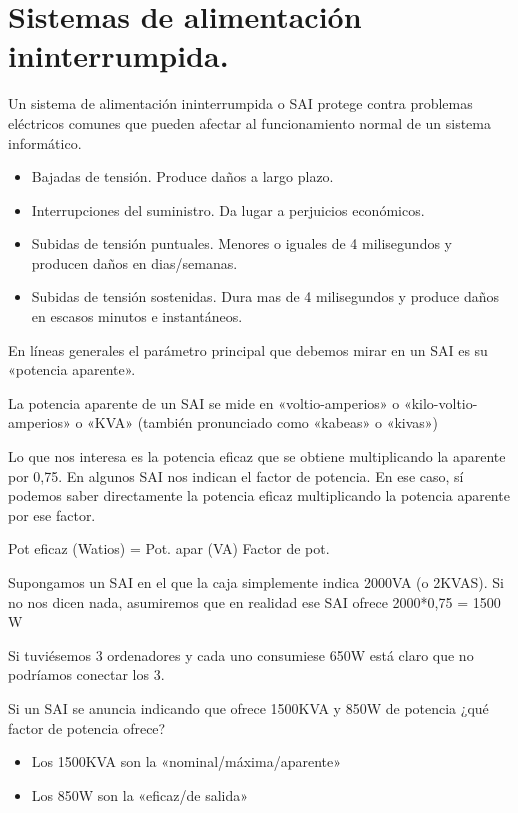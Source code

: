 \documentclass[letterpaper,10pt,spanish]{sphinxmanual}
\begin{document}
\section{Sistemas de alimentación ininterrumpida.}
\label{\detokenize{tema_pautas_seguridad_informatica/tema_pautas_seguridad_informatica:sistemas-de-alimentacion-ininterrumpida}}
Un sistema de alimentación ininterrumpida o SAI protege contra problemas eléctricos comunes que pueden afectar al funcionamiento normal de un sistema informático.
\begin{itemize}
\item {} 
Bajadas de tensión. Produce daños a largo plazo.

\item {} 
Interrupciones del suministro. Da lugar a perjuicios económicos.

\item {} 
Subidas de tensión puntuales. Menores o iguales de 4 milisegundos y producen daños en dias/semanas.

\item {} 
Subidas de tensión sostenidas. Dura mas de 4 milisegundos y produce daños en escasos minutos e instantáneos.

\end{itemize}

En líneas generales el parámetro principal que debemos mirar en un SAI es su «potencia aparente».

La potencia aparente de un SAI se mide en «voltio-amperios» o «kilo-voltio-amperios» o «KVA» (también pronunciado como «kabeas» o «kivas»)

Lo que nos interesa es la potencia eficaz que se obtiene multiplicando la aparente por 0,75. En algunos SAI nos indican el factor de potencia. En ese caso, sí podemos saber directamente la potencia eficaz multiplicando la potencia aparente por ese factor.

Pot eficaz (Watios) = Pot. apar (VA) Factor de pot.

Supongamos un SAI en el que la caja simplemente indica 2000VA (o 2KVAS). Si no nos dicen nada, asumiremos que en realidad ese SAI ofrece 2000*0,75 = 1500 W

Si tuviésemos 3 ordenadores y cada uno consumiese 650W está claro que no podríamos conectar los 3.

Si un SAI se anuncia indicando que ofrece 1500KVA y 850W de potencia ¿qué factor de potencia ofrece?
\begin{itemize}
\item {} 
Los 1500KVA son la «nominal/máxima/aparente»

\item {} 
Los 850W son la «eficaz/de salida»

\end{itemize}
\end{document}

